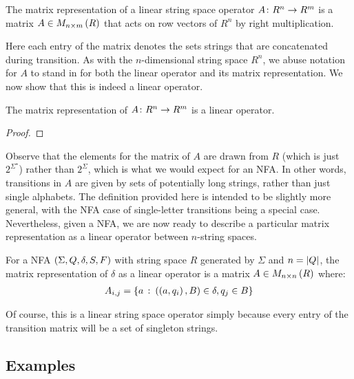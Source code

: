 \documentclass[12pt]{article}
\begin{document}
\begin{definition}
  The matrix representation of a linear string space operator
  \(A \colon R^n \to R^m\) is a matrix
  \(A \in M_{n \times m} \left(R\right)\) that
  acts on row vectors of \(R^n\) by right multiplication.
\end{definition}

Here each entry of the matrix denotes the sets strings that are
concatenated during transition.
As with the \(n\)-dimensional string space \(R^n\),
we abuse notation for \(A\) to stand in for
both the linear operator and its matrix representation.
We now show that this is indeed a linear operator.

\begin{theorem}
  The matrix representation of \(A \colon R^n \to R^m\) is a linear operator.
\end{theorem}
\begin{proof}
\end{proof}

Observe that the elements for the matrix of \(A\) are drawn from
\(R\) (which is just \(2^{\Sigma^\star}\))
rather than \(2^{\Sigma}\),
which is what we would expect for an NFA.
In other words, transitions in \(A\) are given by sets of potentially
long strings, rather than just single alphabets.
The definition provided here is intended to be slightly more general,
with the NFA case of single-letter transitions being a special case.
Nevertheless,
given a NFA, we are now ready to describe a particular matrix representation
as a linear operator between \(n\)-string spaces.

\begin{definition}
  For a NFA \(\left(\Sigma, Q, \delta, S, F\right)\) with
  string space \(R\) generated by \(\Sigma\) and \(n = \left\lvert Q\right\rvert\),
  the matrix representation of \(\delta\) as a linear operator
  is a matrix
  \(A \in M_{n \times n} \left(R\right)\)  where:
  \begin{align*}
    A_{i, j}
      = \left\{a \ \colon \left(\left(a, q_i\right), B\right) \in \delta, q_j \in B\right\}
  \end{align*}
\end{definition}

Of course, this is a linear string space operator simply because
every entry of the transition matrix will be a set of singleton strings.



\subsection{Examples}
\end{document}
